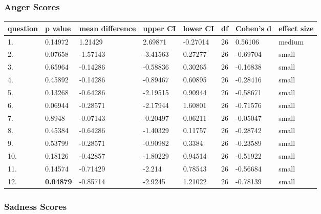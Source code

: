 \documentclass[11pt, twoside, reqno]{book}
\begin{document}
\subsubsection{\textbf{Anger Scores}}

\begin{tabular}{|l|l|l|l|l|l|l|l|}
\hline
    question & p value & mean difference & upper CI & lower CI & df & Cohen's d & effect size  \\ \hline
    1. & 0.14972 & 1.21429 & 2.69871 & -0.27014 & 26 & 0.56106 & medium \\ \hline
    2. & 0.07658 & -1.57143 & -3.41563 & 0.27277 & 26 & -0.69704 & small \\ \hline
    3. & 0.65964 & -0.14286 & -0.58836 & 0.30265 & 26 & -0.16838 & small \\ \hline
    4. & 0.45892 & -0.14286 & -0.89467 & 0.60895 & 26 & -0.28416 & small \\ \hline
    5. & 0.13268 & -0.64286 & -2.19515 & 0.90944 & 26 & -0.58671 & small \\ \hline
    6. & 0.06944 & -0.28571 & -2.17944 & 1.60801 & 26 & -0.71576 & small \\ \hline
    7. & 0.8948 & -0.07143 & -0.20497 & 0.06211 & 26 & -0.05047 & small \\ \hline
    8. & 0.45384 & -0.64286 & -1.40329 & 0.11757 & 26 & -0.28742 & small \\ \hline
    9. & 0.53799 & -0.28571 & -0.90982 & 0.3384 & 26 & -0.23589 & small \\ \hline
    10. & 0.18126 & -0.42857 & -1.80229 & 0.94514 & 26 & -0.51922 & small \\ \hline
    11. & 0.14574 & -0.71429 & -2.214 & 0.78543 & 26 & -0.56684 & small \\ \hline
    12. & \textbf{0.04879} & -0.85714 & -2.9245 & 1.21022 & 26 & -0.78139 & small \\ \hline
\end{tabular}
\vspace{16pt}

\subsubsection{\textbf{Sadness Scores}}
\end{document}
